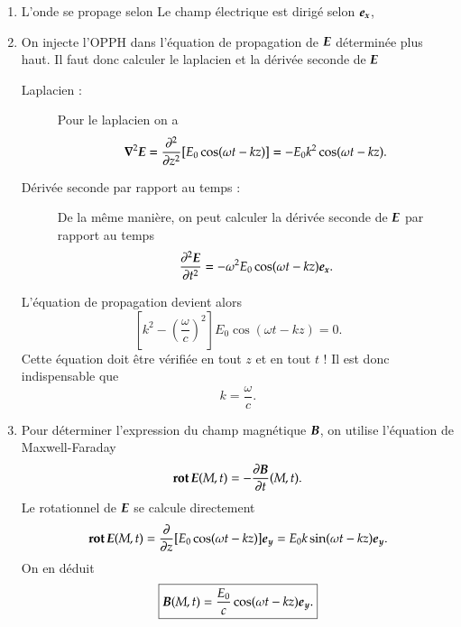 \begin{corrige}
\begin{enumerate}
	  \item L'onde se propage selon 
	    Le champ électrique est dirigé selon $\ex$, 

	  \item On injecte l'OPPH dans l'équation de propagation de $\vece$ 
	    déterminée plus haut. Il faut donc calculer le laplacien et 
	    la dérivée seconde de $\vece$
	    \begin{description}
		    \item[Laplacien : ] Pour le laplacien on a
		    \begin{equation*}
			\laplacien \vece = \dd{^2}{z^2}[E_0 \cos(\omega t - k z)]
			= - E_0 k^2 \cos(\omega t - k z).
		    \end{equation*}

	    	\item[Dérivée seconde par rapport au temps : ] De la même manière, 
		 on peut calculer la dérivée seconde de $\vece$ par rapport au temps
		 \begin{equation*}
			 \dd{^2\vece}{t^2} = - \omega^2 E_0 \cos(\omega t - k z)\ex.
	         \end{equation*}
	    \end{description}
	    L'équation de propagation devient alors
	    \begin{equation*}
		    \left[k^2 - \left(\dfrac{\omega}{c}\right)^2\right]
		    E_0 \cos(\omega t - k z) = 0.
	    \end{equation*}
	    Cette équation doit être vérifiée en tout $z$ et en tout $t$ ! Il est 
	    donc indispensable que
	    \begin{equation*}
		    \boxed{
			    k = \dfrac{\omega}{c}.
			  }
	    \end{equation*}

    	   \item Pour déterminer l'expression du champ magnétique $\vecb$, on utilise
      	     l'équation de Maxwell-Faraday
      	     \begin{equation*}
		     \rot \vece(M, t) = - \dd{\vecb}{t}(M, t).
	     \end{equation*}
	     Le rotationnel de $\vece$ se calcule directement
	     \begin{equation*}
		     \rot \vece(M, t) = \dd{}{z} [E_0\cos(\omega t - k z)] \ey
		 	    = E_0 k \sin(\omega t - k z) \ey.
	     \end{equation*}
	     On en déduit
	     \begin{equation*}
		     \boxed{
			     \vecb(M, t) = \dfrac{E_0}{c} \cos(\omega t - k z) \ey.
			   }
	     \end{equation*}


\end{enumerate}
\end{corrige}

